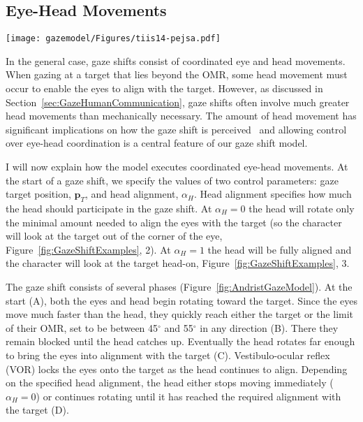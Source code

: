 \subsection{Eye-Head Movements}
\label{sec:GazeShiftHead}

\begin{figure*}[b]
\centering
\texttt{[image: gazemodel/Figures/tiis14-pejsa.pdf]}
\caption{Movement phases of the eyes and head in a gaze shift.}
\label{fig:AndristGazeModel}
\end{figure*}

In the general case, gaze shifts consist of coordinated eye and head movements. When gazing at a target that lies beyond the OMR, some head movement must occur to enable the eyes to align with the target. However, as discussed in Section~\ref{sec:GazeHumanCommunication}, gaze shifts often involve much greater head movements than mechanically necessary. The amount of head movement has significant implications on how the gaze shift is perceived~\cite{andrist2012designing} and allowing control over eye-head coordination is a central feature of our gaze shift model.

I will now explain how the model executes coordinated eye-head movements. At the start of a gaze shift, we specify the values of two control parameters: gaze target position, $\mathbf{p}_T$, and head alignment, $\alpha_H$. Head alignment specifies how much the head should participate in the gaze shift. At $\alpha_H = 0$ the head will rotate only the minimal amount needed to align the eyes with the target (so the character will look at the target out of the corner of the eye, Figure~\ref{fig:GazeShiftExamples}, 2). At $\alpha_H = 1$ the head will be fully aligned and the character will look at the target head-on, Figure~\ref{fig:GazeShiftExamples}, 3.

The gaze shift consists of several phases (Figure~\ref{fig:AndristGazeModel}). At the start (A), both the eyes and head begin rotating toward the target. Since the eyes move much faster than the head, they quickly reach either the target or the limit of their OMR, set to be between 45$^{\circ}$ and 55$^{\circ}$ in any direction (B). There they remain blocked until the head catches up. Eventually the head rotates far enough to bring the eyes into alignment with the target (C). Vestibulo-ocular reflex (VOR) locks the eyes onto the target as the head continues to align. Depending on the specified head alignment, the head either stops moving immediately ($\alpha_H = 0$) or continues rotating until it has reached the required alignment with the target (D).

